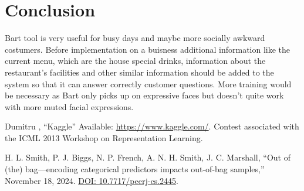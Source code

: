 \documentclass[conference]{IEEEtran}
\begin{document}
\section*{Conclusion}
Bart tool is very useful for busy days and maybe more socially awkward costumers. Before implementation on a buisness additional information like
the current menu, which are the house special drinks, information about the restaurant's facilities and other similar information should be added
to the system so that it can answer correctly customer questions. More training would be necessary as Bart only picks up on expressive faces
but doesn't quite work with more muted facial expressions. 

\begin{thebibliography}{00}
 Dumitru , ``Kaggle'' Available:  \href{https://www.kaggle.com/c/challenges-in-representation-learning-facial-expression-recognition-challenge/overview}{https://www.kaggle.com/}. Contest associated with the ICML 2013 Workshop on Representation Learning.

 H. L. Smith, P. J. Biggs, N. P. French, A. N. H. Smith, J. C. Marshall, ``Out of (the) bag—encoding categorical predictors impacts out-of-bag samples,'' November 18, 2024. \href{https://doi.org/10.7717/peerj-cs.2445}{DOI: 10.7717/peerj-cs.2445}.


\end{thebibliography}
\end{document}
